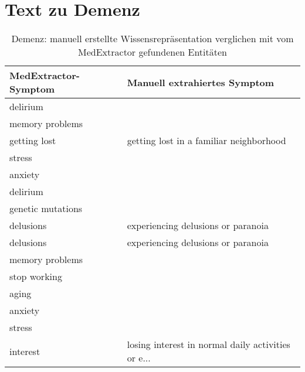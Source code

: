\section{Text zu Demenz}
\label{sec:dementia} 

\begin{table}[H]
\begin{center}
\begin{tabular}{ll}
\toprule
  MedExtractor-Symptom &                       Manuell extrahiertes Symptom \\
\midrule
                  delirium &                                                    \\
     memory problems &                                                    \\
        getting lost &            getting lost in a familiar neighborhood \\
              stress &                                                    \\
             anxiety &                                                    \\
            delirium &                                                    \\
   genetic mutations &                                                    \\
           delusions &                 experiencing delusions or paranoia \\
           delusions &                 experiencing delusions or paranoia \\
     memory problems &                                                    \\
        stop working &                                                    \\
               aging &                                                    \\
             anxiety &                                                    \\
              stress &                                                    \\
            interest & losing interest in normal daily activities or e... \\
\bottomrule
\end{tabular}
\caption{Demenz: manuell erstellte Wissensrepräsentation verglichen mit vom MedExtractor gefundenen Entitäten}
\label{tab:dementia_vergleich_manuell_medextractor}
\end{center}
\end{table}


